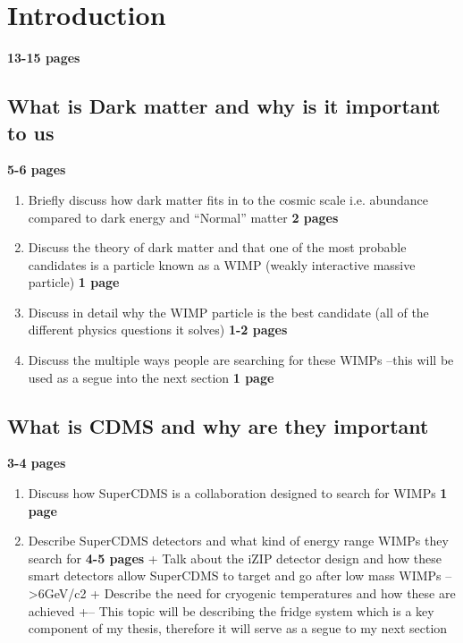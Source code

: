 \section{Introduction}

\textbf{13-15 pages}

\subsection{What is Dark matter and why is it important to us} \label{sec:darkmatter} \textbf{5-6 pages}


\begin{enumerate}
    \item Briefly discuss how dark matter fits in to the cosmic scale i.e. abundance compared to dark energy and “Normal” matter \textbf{2 pages}
    \item Discuss the theory of dark matter and that one of the most probable candidates is a particle known as a WIMP (weakly interactive massive particle) \textbf{1 page}
    \item Discuss in detail why the WIMP particle is the best candidate (all of the different physics questions it solves) \textbf{1-2 pages}
    \item Discuss the multiple ways people are searching for these WIMPs –this will be used as a segue into the next section \textbf{1 page}
\end{enumerate}

\subsection{What is CDMS and why are they important} \textbf{3-4 pages}

\begin{enumerate}
    \item Discuss how SuperCDMS is a collaboration designed to search for WIMPs \textbf{1 page}
    \item Describe SuperCDMS detectors and what kind of energy range WIMPs they search for \textbf{4-5 pages}
        + Talk about the iZIP detector design and how these smart detectors allow SuperCDMS to target and go after low mass WIMPs –   >6GeV/c2
        + Describe the need for cryogenic temperatures and how these are achieved
        +--	This topic will be describing the fridge system which is a key component of my thesis, therefore it will serve as a segue to my next section
\end{enumerate}

